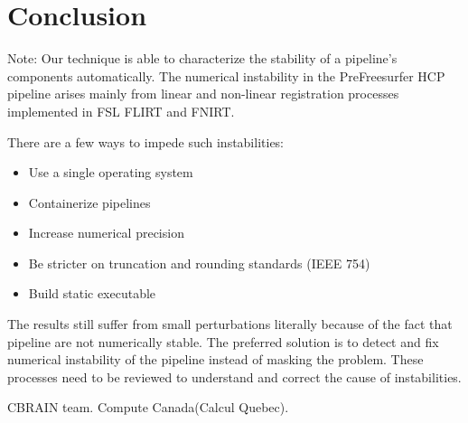 \documentclass[a4paper,num-refs]{oup-contemporary}
\newcommand{\note}[2]{\color{blue}Note: #1\color{black}}
\begin{document}
\section{Conclusion}

\note{Our technique is able to characterize the stability of a pipeline's 
components automatically. The numerical instability in the 
PreFreesurfer HCP pipeline arises mainly from linear and non-linear 
registration processes implemented in FSL FLIRT and FNIRT. 

There are a few ways to impede such instabilities:
\begin{itemize}
\item Use a single operating system
\item Containerize pipelines
\item Increase numerical precision
\item Be stricter on truncation and rounding standards (IEEE 754)
\item Build static executable
\end{itemize}

The results still suffer from small perturbations literally because of 
the fact that pipeline are not numerically stable. The preferred 
solution is to detect and fix numerical instability of the pipeline 
instead of masking the problem. These processes need to be reviewed to 
understand and correct the cause of instabilities. }

\section{Acknowledgments}

CBRAIN team. Compute Canada(Calcul Quebec).



\end{document}
